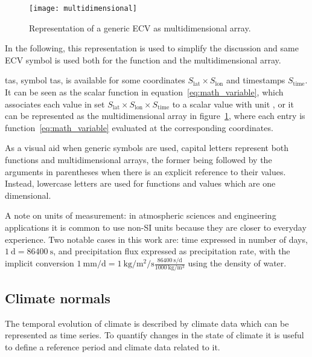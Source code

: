 \begin{figure}[h]
  \centering
  \texttt{[image: multidimensional]}
  \caption{Representation of a generic \gls{ECV} as multidimensional array.}
  \label{fig:multidimensional}
\end{figure}
In the following, this representation is used to simplify the discussion and same \gls{ECV} symbol is used both for the function and the multidimensional array.
\begin{example}
  \Glsdesc{tas}, symbol \gls{tas}, is available for some coordinates $S_\text{lat} \times S_\text{lon}$ and timestamps $S_\text{time}$. It can be seen as the scalar function in equation~\eqref{eq:math_variable}, which associates each value in set $S_\text{lat} \times S_\text{lon} \times S_\text{time}$ to a scalar value with unit , or it can be represented as the multidimensional array in figure~\ref{fig:multidimensional}, where each entry is function~\eqref{eq:math_variable} evaluated at the corresponding coordinates.
\end{example}

As a visual aid when generic symbols are used, capital letters represent both functions and multidimensional arrays, the former being followed by the arguments in parentheses when there is an explicit reference to their values. Instead, lowercase letters are used for functions and values which are one dimensional.

A note on units of measurement: in atmospheric sciences and engineering applications it is common to use non-SI units because they are closer to everyday experience. Two notable cases in this work are: time expressed in number of days, $\qty{1}{\day} = \qty{86400}{\second}$, and precipitation flux expressed as precipitation rate, with the implicit conversion $\qty{1}{\milli\metre\per\day} = \qty{1}{\kilo\gram\per\square\metre\per\second} \frac{\qty{86400}{\second\per\day}}{\qty{1000}{\kilo\gram\per\cubic\metre}}$ using the density of water.



\subsection{Climate normals}
\label{sec:Climate normals}
The temporal evolution of climate is described by climate data which can be represented as time series. To quantify changes in the state of climate it is useful to define a reference period and climate data related to it.

